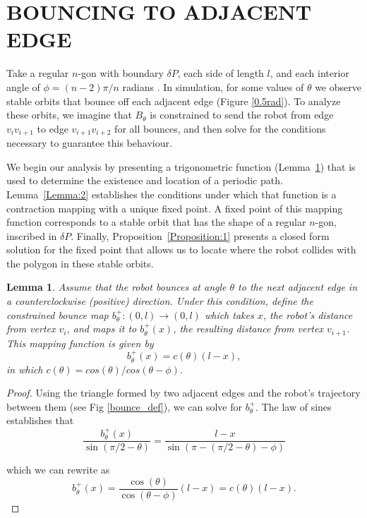 \documentclass[letterpaper, 10 pt, conference]{ieeeconf}  %
\newtheorem{lemma}{\bf Lemma}
\begin{document}
\section{BOUNCING TO ADJACENT EDGE\label{adj_edge}}
\label{section:BAE}

Take a regular $n$-gon with boundary $\delta P$, each side of length $l$, and
each interior angle of $\phi = (n - 2)\pi/n$ radians \cite{johnson1929}. In simulation, for some values of $\theta$ we observe
stable orbits that bounce off each adjacent edge (Figure \ref{0.5rad}). 
To analyze these orbits, we imagine that $B_{\theta}$ is
constrained to send the robot from edge $v_i v_{i+1}$ to edge $v_{i+1} v_{i+2}$
for all bounces, and then solve for the conditions necessary to guarantee this
behaviour. 

We begin our analysis by presenting a trigonometric function
(Lemma~\ref{Lemma:1}) that is used to determine the existence and location of a
periodic path. Lemma~\ref{Lemma:2} establishes the conditions under which
that function is a contraction mapping with a unique fixed point. A fixed point
of this mapping function corresponds to a stable orbit that has the shape of a
regular $n$-gon, inscribed in $\delta P$. Finally,
Proposition~\ref{Proposition:1} presents a closed form solution for the fixed
point that allows us to locate where the robot collides with the polygon in
these stable orbits.

\begin{lemma} \label{Lemma:1}
Assume that the robot bounces at angle $\theta$ to the next adjacent edge in a
counterclockwise (positive) direction. Under this condition, define the constrained bounce
map $b^+_{\theta} : (0, l) \to (0, l)$ which takes $x$, the
robot's distance from vertex $v_i$, and maps it to $b^+_{\theta}(x)$,
the resulting distance from vertex $v_{i+1}$. This mapping function is given by
\begin{equation} \label{b-one-bounce}
b^+_{\theta}(x) = c(\theta)(l-x),
\end{equation}
in which $c(\theta) = cos(\theta) / cos(\theta - \phi)$.
\end{lemma}
\begin{proof}
Using the triangle formed by two adjacent edges and the robot's trajectory
between them (see Fig \ref{bounce_def}), we can solve for $b^+_{\theta}$.
The law of sines establishes that
$$ \frac{b^+_{\theta}(x)}{\sin (\pi/2-\theta)} = \frac{l-x}{\sin
(\pi-(\pi/2-\theta)-\phi)} $$

\noindent which we can rewrite as
$$ b^+_{\theta}(x) = \frac{\cos(\theta)}{\cos
(\theta-\phi)}(l-x)  = c(\theta) (l-x). $$

\end{proof}
\end{document}
